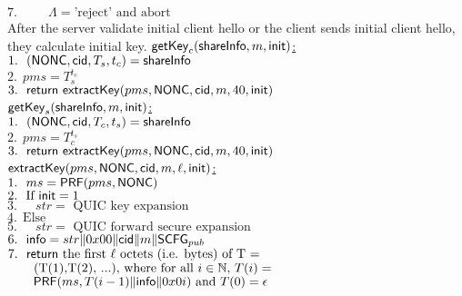  $7.\ \ \quad \quad \Lambda = \text{'reject' and abort}$ \\
%
After the server validate initial client hello or the
client sends initial client hello, they calculate initial
key.
\noindent
\underline{$\mathsf{getKey}_c(\mathsf{shareInfo}, m, \mathsf{init})$:} \\
 $1.\ \ (\mathsf{NONC}, \mathsf{cid} ,T_s, t_c) = \mathsf{shareInfo}$ \\
 $2.\ \ pms = T_s^{t_c}$ \\
 $3.\ \ \mathsf{return}\ \mathsf{extractKey}(pms, \mathsf{NONC}, \mathsf{cid}, m, 40, \mathsf{init})$ \\
\underline{$\mathsf{getKey}_s(\mathsf{shareInfo}, m, \mathsf{init})$:} \\
 $1.\ \ (\mathsf{NONC}, \mathsf{cid} ,T_c, t_s) = \mathsf{shareInfo}$ \\
 $2.\ \ pms = T_c^{t_s}$ \\
 $3.\ \ \mathsf{return}\ \mathsf{extractKey}(pms, \mathsf{NONC}, \mathsf{cid}, m, 40, \mathsf{init})$ \\
\underline{$\mathsf{extractKey}(pms, \mathsf{NONC}, \mathsf{cid}, m, \ell, \mathsf{init})$:}\\
 $1.\ \ ms = \mathsf{PRF}(pms, \mathsf{NONC})$ \\
 $2.\ \ \text{If } \mathsf{init} = 1$ \\
 $3.\ \ \quad str = \text{ QUIC key expansion }$ \\
 $4.\ \ \text{Else }$ \\
 $5.\ \ \quad str = \text{ QUIC forward secure expansion }$ \\
 $6.\ \ \mathsf{info} = str \| 0x00 \| \mathsf{cid} \| m \| \mathsf{SCFG}_{pub}$ \\
 $7.\ \ \mathsf{return}\ \text{the first $\ell$ octets (i.e. bytes) of T = }$ \\
 $\quad \quad \text{(T(1),T(2), ...), where for all $i \in \mathbb{N}$, $T(i) = $} $\\
 $\quad \quad \text{$\mathsf{PRF}(ms, T(i-1) \| \mathsf{info} \| 0x0i)$ and $T(0) = \epsilon$} $\\